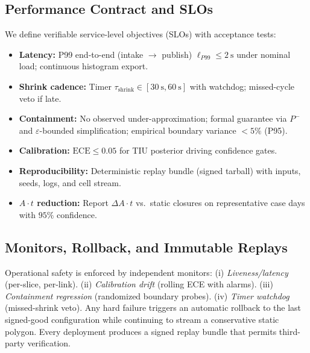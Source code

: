 \documentclass[journal]{new-aiaa}
\newcommand{\At}{\ensuremath{A\cdot t}}
\begin{document}
\subsection{Performance Contract and SLOs}
We define verifiable service-level objectives (SLOs) with acceptance tests:
\begin{itemize}
\item \textbf{Latency:} P99 end-to-end (intake $\rightarrow$ publish) $\ell_{P99}\le \SI{2}{\second}$ under nominal load; continuous histogram export.
\item \textbf{Shrink cadence:} Timer $\tau_{\text{shrink}}\in[\SI{30}{\second},\SI{60}{\second}]$ with watchdog; missed-cycle veto if late.
\item \textbf{Containment:} No observed under-approximation; formal guarantee via $P^-$ and $\varepsilon$-bounded simplification; empirical boundary variance $<5\%$ (P95).
\item \textbf{Calibration:} $\mathrm{ECE}\le 0.05$ for TIU posterior driving confidence gates.
\item \textbf{Reproducibility:} Deterministic replay bundle (signed tarball) with inputs, seeds, logs, and cell stream.
\item \textbf{\At{} reduction:} Report $\Delta \At$ vs.\ static closures on representative case days with $95\%$ confidence.
\end{itemize}

\subsection{Monitors, Rollback, and Immutable Replays}
Operational safety is enforced by independent monitors:
(i) \emph{Liveness/latency} (per-slice, per-link).
(ii) \emph{Calibration drift} (rolling ECE with alarms).
(iii) \emph{Containment regression} (randomized boundary probes).
(iv) \emph{Timer watchdog} (missed-shrink veto).
Any hard failure triggers an automatic rollback to the last signed-good configuration while continuing to stream a conservative static polygon. Every deployment produces a signed replay bundle that permits third-party verification.
\end{document}
